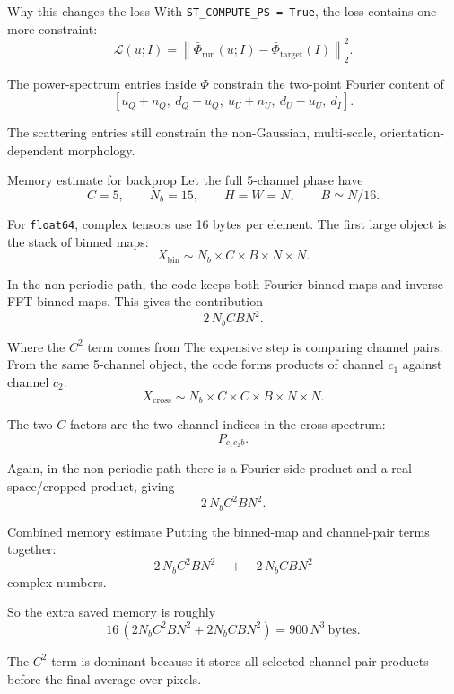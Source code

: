 \documentclass[aspectratio=169,11pt]{beamer}
\begin{document}
\begin{frame}[fragile]{Why this changes the loss}
With \texttt{ST\_COMPUTE\_PS = True}, the loss contains one more constraint:
\[
  \mathcal L(u;I)
  =
  \left\|
    \bar\Phi_{\mathrm{run}}(u;I)
    -
    \bar\Phi_{\mathrm{target}}(I)
  \right\|_2^2.
\]

\vspace{0.25em}
The power-spectrum entries inside $\Phi$ constrain the two-point Fourier
content of
\[
  [u_Q+n_Q,\ d_Q-u_Q,\ u_U+n_U,\ d_U-u_U,\ d_I].
\]

\vspace{0.25em}
The scattering entries still constrain the non-Gaussian, multi-scale,
orientation-dependent morphology.
\end{frame}

\begin{frame}[fragile]{Memory estimate for backprop}
Let the full 5-channel phase have
\[
  C=5,\qquad N_b=15,\qquad H=W=N,\qquad B\simeq N/16.
\]

\vspace{0.25em}
For \texttt{float64}, complex tensors use 16 bytes per element.
The first large object is the stack of binned maps:
\[
  X_{\mathrm{bin}}
  \sim
  N_b\times C\times B\times N\times N.
\]

\vspace{0.25em}
In the non-periodic path, the code keeps both Fourier-binned maps and
inverse-FFT binned maps. This gives the contribution
\[
  2\,N_bCBN^2.
\]
\end{frame}

\begin{frame}[fragile]{Where the $C^2$ term comes from}
The expensive step is comparing channel pairs. From the same 5-channel object,
the code forms products of channel $c_1$ against channel $c_2$:
\[
  X_{\mathrm{cross}}
  \sim
  N_b\times C\times C\times B\times N\times N.
\]

\vspace{0.25em}
The two $C$ factors are the two channel indices in the cross spectrum:
\[
  P_{c_1c_2b}.
\]

\vspace{0.25em}
Again, in the non-periodic path there is a Fourier-side product and a
real-space/cropped product, giving
\[
  2\,N_bC^2BN^2.
\]
\end{frame}

\begin{frame}[fragile]{Combined memory estimate}
Putting the binned-map and channel-pair terms together:
\[
  2\,N_bC^2BN^2
  \quad+\quad
  2\,N_bCBN^2
\]
complex numbers.

\vspace{0.25em}
So the extra saved memory is roughly
\[
  16\,(2N_bC^2BN^2+2N_bCBN^2)
  =
  900\,N^3\ \text{bytes}.
\]

\vspace{0.25em}
The $C^2$ term is dominant because it stores all selected channel-pair
products before the final average over pixels.
\end{frame}
\end{document}

